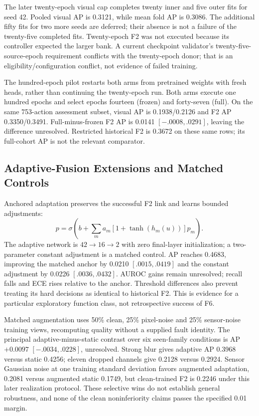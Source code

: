 The later twenty-epoch visual cap completes twenty inner and five outer fits for seed 42. Pooled visual AP is 0.3121, while mean fold AP is 0.3086. The additional fifty fits for two more seeds are deferred; their absence is not a failure of the twenty-five completed fits. Twenty-epoch F2 was not executed because its controller expected the larger bank. A current checkpoint validator's twenty-five-source-epoch requirement conflicts with the twenty-epoch donor; that is an eligibility/configuration conflict, not evidence of failed training.

The hundred-epoch pilot restarts both arms from pretrained weights with fresh heads, rather than continuing the twenty-epoch run. Both arms execute one hundred epochs and select epochs fourteen (frozen) and forty-seven (full). On the same 753-action assessment subset, visual AP is 0.1938/0.2126 and F2 AP 0.3350/0.3491. Full-minus-frozen F2 AP is 0.0141 $[-.0008,.0291]$, leaving the difference unresolved. Restricted historical F2 is 0.3672 on these same rows; its full-cohort AP is not the relevant comparator.

\subsection{Adaptive-Fusion Extensions and Matched Controls}
Anchored adaptation preserves the successful F2 link and learns bounded adjustments:
\begin{equation}p=\sigma\!\left(b+\sum_m a_m[1+\tanh(h_m(u))]p_m\right).\end{equation}
The adaptive network is $42\rightarrow16\rightarrow2$ with zero final-layer initialization; a two-parameter constant adjustment is a matched control. AP reaches 0.4683, improving the matched anchor by 0.0210 $[.0015,.0419]$ and the constant adjustment by 0.0226 $[.0036,.0432]$. AUROC gains remain unresolved; recall falls and ECE rises relative to the anchor. Threshold differences also prevent treating its hard decisions as identical to historical F2. This is evidence for a particular exploratory function class, not retrospective success of F6.

Matched augmentation uses 50\% clean, 25\% pixel-noise and 25\% sensor-noise training views, recomputing quality without a supplied fault identity. The principal adaptive-minus-static contrast over six seen-family conditions is AP $+0.0097$ $[-.0034,.0228]$, unresolved. Strong blur gives adaptive AP 0.3968 versus static 0.4256; eleven dropped channels give 0.2128 versus 0.2924. Sensor Gaussian noise at one training standard deviation favors augmented adaptation, 0.2081 versus augmented static 0.1749, but clean-trained F2 is 0.2246 under this later realization protocol. These selective wins do not establish general robustness, and none of the clean noninferiority claims passes the specified 0.01 margin.

